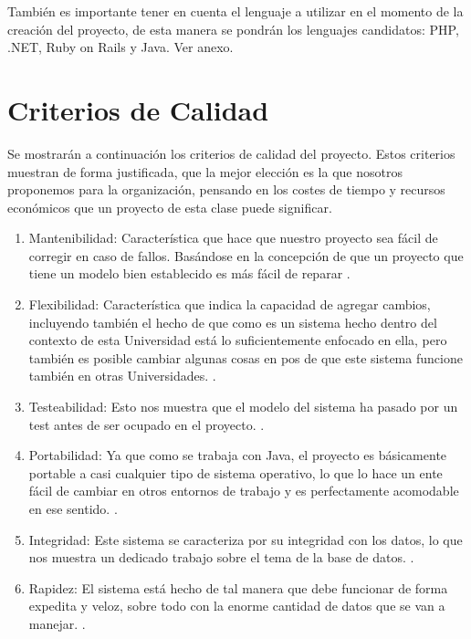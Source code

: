 \documentclass[a4paper,12pt,openany,oneside]{book}
\begin{document}
También es importante tener en cuenta el lenguaje a utilizar en el momento de la creación del proyecto, de esta manera se pondrán los lenguajes candidatos: PHP, .NET, Ruby on Rails y Java. Ver anexo.



\section{Criterios de Calidad}

Se mostrarán a continuación los criterios de calidad del proyecto. Estos criterios muestran de forma justificada, que la mejor elección es la que nosotros proponemos para la organización, pensando en los costes de tiempo y recursos económicos que un proyecto de esta clase puede significar.

\begin{enumerate}

\item Mantenibilidad: Característica que hace que nuestro proyecto sea fácil de corregir en caso de fallos. Basándose en la concepción de que un proyecto que tiene un modelo bien establecido es más fácil de reparar \cite{data11}.

\item Flexibilidad: Característica que indica la capacidad de agregar cambios, incluyendo también el hecho de que como es un sistema hecho dentro del contexto de esta Universidad está lo suficientemente enfocado en ella, pero también es posible cambiar algunas cosas en pos de que este sistema funcione también en otras Universidades. \cite{data11}.

\item Testeabilidad: Esto nos muestra que el modelo del sistema ha pasado por un test antes de ser ocupado en el proyecto. \cite{data11}.

\item Portabilidad: Ya que como se trabaja con Java, el proyecto es básicamente portable a casi cualquier tipo de sistema operativo, lo que lo hace un ente fácil de cambiar en otros entornos de trabajo y es perfectamente acomodable en ese sentido. \cite{data11}.

\item Integridad: Este sistema se caracteriza por su integridad con los datos, lo que nos muestra un dedicado trabajo sobre el tema de la base de datos. \cite{data11}.

\item Rapidez: El sistema está hecho de tal manera que debe funcionar de forma expedita y veloz, sobre todo con la enorme cantidad de datos que se van a manejar. \cite{data11}.

\end{enumerate}
\end{document}
